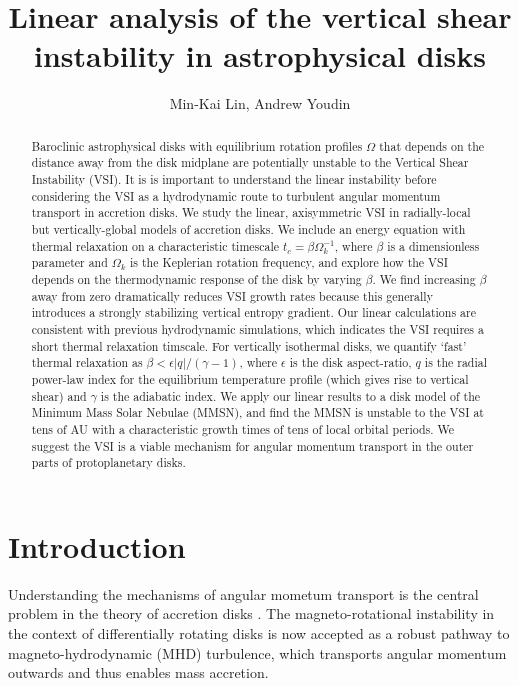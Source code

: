 \documentclass[iop]{emulateapj}
\begin{document}
\title{Linear analysis of the vertical shear instability in astrophysical disks}

\author{Min-Kai Lin, Andrew Youdin}

\begin{abstract}
  Baroclinic astrophysical disks with equilibrium rotation profiles
  $\Omega$ that depends on the distance away from the disk midplane are
  potentially unstable to the Vertical Shear Instability (VSI). It is
  is important to understand the linear instability before
  considering the VSI as a hydrodynamic route to turbulent angular
  momentum transport in accretion disks. We study the linear,
  axisymmetric VSI in radially-local but vertically-global models
  of accretion disks. We include an energy equation with thermal
  relaxation on a characteristic timescale $t_c=\beta\Omega_k^{-1}$,
  where $\beta$ is a dimensionless parameter and $\Omega_k$ is the
  Keplerian rotation frequency, and explore how the VSI depends on the
  thermodynamic response  of the disk by varying $\beta$. We find
  increasing $\beta$ away from zero dramatically reduces VSI growth
  rates because this generally introduces a strongly stabilizing
  vertical entropy gradient. Our linear calculations are consistent
  with previous hydrodynamic simulations, which indicates the VSI 
  requires a short thermal relaxation timscale. For vertically  
  isothermal disks, we quantify `fast'
  thermal relaxation as $\beta < \epsilon|q|/(\gamma-1)$, where
  $\epsilon$ is the disk aspect-ratio, $q$ is the radial power-law
  index for the equilibrium temperature profile (which gives rise to vertical 
  shear) and $\gamma$ is the adiabatic index. We apply our linear
  results to a disk model of the Minimum Mass Solar Nebulae (MMSN), and
  find the MMSN is unstable to the VSI at tens of AU with a
  characteristic growth times of tens of local orbital periods. We 
  suggest the VSI is a viable mechanism for angular momentum
  transport in the outer parts of protoplanetary disks. 
\end{abstract}

\section{Introduction}
Understanding the mechanisms of angular mometum transport is the
central problem in the theory of accretion disks 
\citep{lyndenbell74}. The   
magneto-rotational instability in the context of differentially
rotating disks \citep[MRI,][]{balbus91} is now accepted as a robust
pathway to magneto-hydrodynamic (MHD) turbulence, which transports
angular momentum outwards and thus enables mass accretion. 
\end{document}
